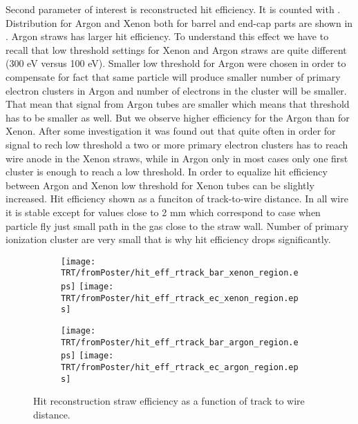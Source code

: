 Second parameter of interest is reconstructed hit efficiency. It is counted with .
Distribution for Argon and Xenon both for barrel and end-cap parts are shown in .
Argon straws has larger hit efficiency. To understand this effect we have to recall that low threshold settings
for Xenon and Argon straws are quite different (300 eV versus 100 eV). Smaller low threshold for Argon were chosen 
in order to compensate for fact that same particle will produce smaller number of primary electron clusters in Argon 
and number of electrons in the cluster will be smaller. That mean that signal from Argon tubes are smaller which means
that threshold has to be smaller as well. But we observe higher efficiency for the Argon than for Xenon. After some investigation
it was found out that quite often in order for signal to rech low threshold a two or more primary electron clusters has to reach wire anode in
the Xenon straws, while in Argon only in most cases only one first cluster is enough to reach a low threshold.
In order to equalize hit efficiency between Argon and Xenon low threshold for Xenon tubes can be slightly increased.
Hit efficiency shown as a funciton of track-to-wire distance. In all wire it is stable except for values close to 2 mm which correspond
to case when particle fly just small path in the gas close to the straw wall. Number of primary ionization cluster are very small that is 
why hit efficiency drops significantly.

\begin{figure}

\begin{subfigure}{.5\textwidth}
  \centering
  \texttt{[image: TRT/fromPoster/hit\_eff\_rtrack\_bar\_xenon\_region.eps]}
  \texttt{[image: TRT/fromPoster/hit\_eff\_rtrack\_ec\_xenon\_region.eps]}
\end{subfigure}%
\begin{subfigure}{.5\textwidth}
  \centering
  \texttt{[image: TRT/fromPoster/hit\_eff\_rtrack\_bar\_argon\_region.eps]}
  \texttt{[image: TRT/fromPoster/hit\_eff\_rtrack\_ec\_argon\_region.eps]}
\end{subfigure}

\caption{Hit reconstruction straw efficiency as a function of track to wire distance.}
  \label{fig:hit_eff_rtrack_bar}
\end{figure}

